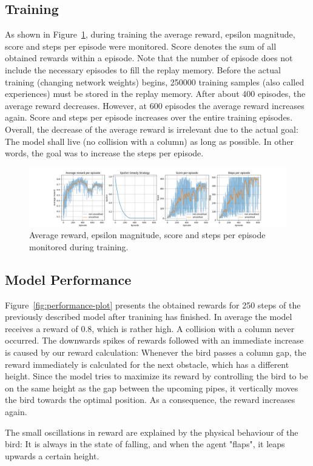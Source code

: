 \subsection{Training}

As shown in Figure~\ref{fig:training-plot}, during training the average reward, epsilon magnitude, score and steps per episode were monitored.  
Score denotes the sum of all obtained rewards within a episode.
Note that the number of episode does not include the necessary episodes to fill the replay memory.
Before the actual training (changing network weights) begins, 250000 training samples (also called experiences) must be stored in the replay memory.
After about 400 episodes, the average reward decreases. 
However, at 600 episodes the average reward increases again.
Score and steps per episode increases over the entire training episodes.
Overall, the decrease of the average reward is irrelevant due to the actual goal: The model shall live (no collision with a column) as long as possible.
In other words, the goal was to increase the steps per episode.

\begin{figure}[h]
    \centering
    \includegraphics[width=\textwidth]{media/trainingPlot.png}
    \caption{Average reward, epsilon magnitude, score and steps per episode monitored during training.}
    \label{fig:training-plot}
\end{figure}

\subsection{Model Performance}

Figure~\ref{fig:performance-plot} presents the obtained rewards for 250 steps of the previously described model after tranining has finished. 
In average the model receives a reward of 0.8, which is rather high.
A collision with a column never occurred.
The downwards spikes of rewards followed with an immediate increase is caused by our reward calculation: Whenever the bird passes a column gap, the reward immediately is calculated for the next obstacle, which has a different height.
Since the model tries to maximize its reward by controlling the bird to be on the same height as the gap between the upcoming pipes, it vertically moves the bird towards the optimal position. 
As a consequence, the reward increases again.
\par
The small oscillations in reward are explained by the physical behaviour of the bird: It is always in the state of falling, and when the agent "flaps", it leaps upwards a certain height. 

